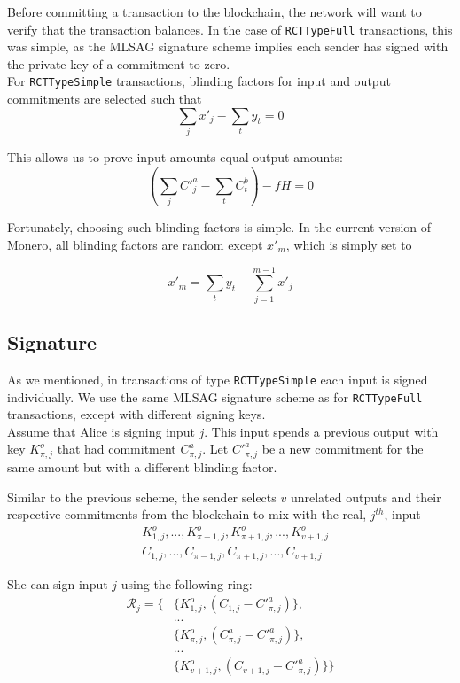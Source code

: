 Before committing a transaction to the blockchain, the network will want to verify that the transaction balances. In the case of {\tt RCTTypeFull} transactions, this was simple, as the MLSAG signature scheme implies each sender has signed with the private key of a commitment to zero.
\\

For {\tt RCTTypeSimple} transactions, blinding factors for input and output commitments are selected such that
\[\sum_j x'_j  - \sum_t y_t = 0  \]

This allows us to prove input amounts equal output amounts:\\
\[ (\sum_j C'^a_{j} - \sum_t C^b_{t}) - f H = 0\]


Fortunately, choosing such blinding factors is simple. In the current version of Monero, all blinding factors are random except $x'_m$, which is simply set to

\[x'_m = \sum_t y_t - \sum_{j=1}^{m-1} x'_j  \]




\subsection{Signature}

As we mentioned, in transactions of type {\tt RCTTypeSimple} each input is signed individually. We use the same MLSAG signature scheme as for {\tt RCTTypeFull} transactions, except with different signing keys.
\\

Assume that Alice is signing input $j$. This input spends a previous output with key $K^o_{\pi,j}$ that had commitment $C^a_{\pi,j}$. Let $C'^a_{\pi,j}$ be a new commitment for the same amount but with a different blinding factor.

Similar to the previous scheme, the sender selects $v$ unrelated outputs and their respective commitments from the blockchain to mix with the real, $j^{th}$, input\vspace{.2cm}
\begin{align*}
& K^o_{1, j}, ..., K^o_{\pi-1, j}, K^o_{\pi+1, j}, ..., K^o_{v+1, j} \\
& C_{1, j}, ..., C_{\pi-1, j}, C_{\pi+1, j}, ..., C_{v+1, j}
\end{align*}


She can sign input $j$ using the following ring:\vspace{.2cm}
\begin{align*}
\mathcal{R}_j = \{ &\{K^o_{1, j}, (C_{1, j} - C'^a_{\pi, j})\}, \\
&... \\
&\{ K^o_{\pi, j}, (C^a_{\pi, j} - C'^a_{\pi, j})\}, \\
&... \\
&\{ K^o_{v+1, j}, (C_{v+1, j} - C'^a_{\pi, j})\}\}
\end{align*}


